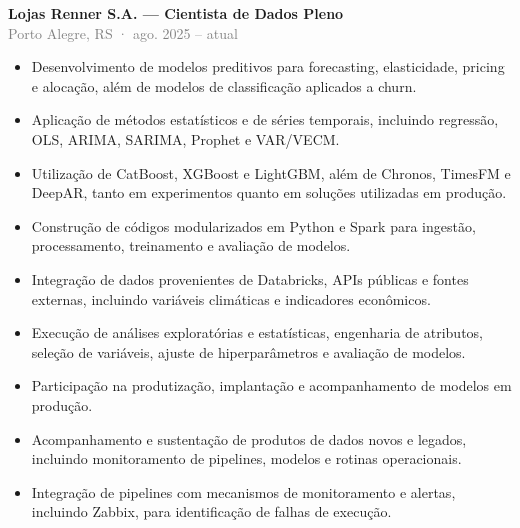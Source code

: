 \documentclass[10pt,a4paper]{article}
\newcommand{\role}[3]{%
  \Needspace{13\baselineskip}%
  \textbf{#1}\\[-1pt]
  {\small\textcolor{grey}{#2}}\\[-1pt]
  #3\par}
\begin{document}
\role{Lojas Renner S.A. — Cientista de Dados Pleno}{Porto Alegre, RS · ago. 2025 – atual}{
\begin{itemize}
  \item Desenvolvimento de modelos preditivos para forecasting, elasticidade, pricing e alocação, além de modelos de classificação aplicados a churn.
  \item Aplicação de métodos estatísticos e de séries temporais, incluindo regressão, OLS, ARIMA, SARIMA, Prophet e VAR/VECM.
  \item Utilização de CatBoost, XGBoost e LightGBM, além de Chronos, TimesFM e DeepAR, tanto em experimentos quanto em soluções utilizadas em produção.
  \item Construção de códigos modularizados em Python e Spark para ingestão, processamento, treinamento e avaliação de modelos.
  \item Integração de dados provenientes de Databricks, APIs públicas e fontes externas, incluindo variáveis climáticas e indicadores econômicos.
  \item Execução de análises exploratórias e estatísticas, engenharia de atributos, seleção de variáveis, ajuste de hiperparâmetros e avaliação de modelos.
  \item Participação na produtização, implantação e acompanhamento de modelos em produção.
  \item Acompanhamento e sustentação de produtos de dados novos e legados, incluindo monitoramento de pipelines, modelos e rotinas operacionais.
  \item Integração de pipelines com mecanismos de monitoramento e alertas, incluindo Zabbix, para identificação de falhas de execução.
\end{itemize}}
\end{document}
